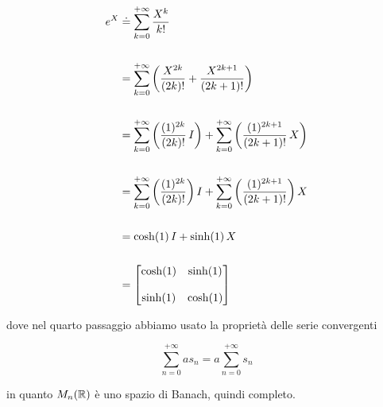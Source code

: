 {\begin{align}
	\begin{split}
		e^{X} &\doteq \sum_{k=0}^{+\infty} \dfrac{X^{k}}{k!} \\ \\
		&= \sum_{k=0}^{+\infty} \left( \dfrac{X^{2k}}{(2k)!} + \dfrac{X^{2k+1}}{(2k+1)!} \right) \\ \\
		&= \sum_{k=0}^{+\infty} \left( \dfrac{(1)^{2k}}{(2k)!} \, I \right) + \sum_{k=0}^{+\infty} \left( \dfrac{(1)^{2k+1}}{(2k+1)!} \, X \right) \\ \\
		&= \sum_{k=0}^{+\infty} \left( \dfrac{(1)^{2k}}{(2k)!} \right) I + \sum_{k=0}^{+\infty} \left( \dfrac{(1)^{2k+1}}{(2k+1)!} \right) X \\ \\
		&= \cosh(1) \, I + \sinh(1) \, X \\ \\
		&= \bmqty{ %
					\cosh(1) & \sinh(1) \\ \\
					\sinh(1) & \cosh(1) %
					}
	\end{split}
\end{align}

dove nel quarto passaggio abbiamo usato la proprietà delle serie convergenti

\begin{equation}
	\sum_{n=0}^{+\infty} a s_{n} = a \sum_{n=0}^{+\infty} s_{n}
\end{equation}

in quanto $ M_{n}(\mathbb{R}) $ è uno spazio di Banach, quindi completo.
}


